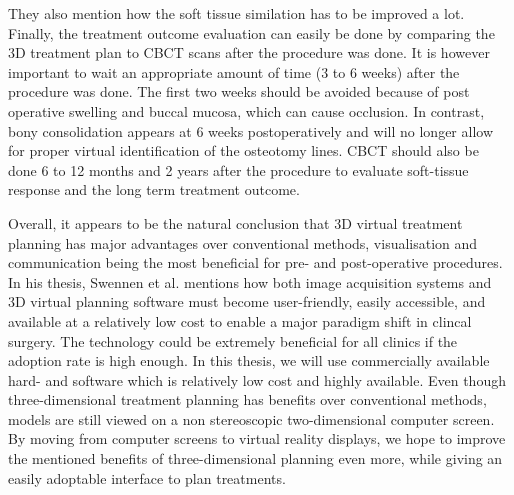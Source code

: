 They also mention how the soft tissue similation has to be improved a lot.
Finally, the treatment outcome evaluation can easily be done by comparing the 3D treatment plan to CBCT scans after the procedure was done.
It is however important to wait an appropriate amount of time (3 to 6 weeks) after the procedure was done.
The first two weeks should be avoided because of post operative swelling and buccal mucosa, which can cause occlusion.
In contrast, bony consolidation appears at 6 weeks postoperatively and will no longer allow for proper virtual identification of the osteotomy lines.
CBCT should also be done 6 to 12 months and 2 years after the procedure to evaluate soft-tissue response and the long term treatment outcome.

Overall, it appears to be the natural conclusion that 3D virtual treatment planning has major advantages over conventional methods, visualisation and communication being the most beneficial for pre- and post-operative procedures.
In his thesis, Swennen et al. mentions how both image acquisition systems and 3D virtual planning software must become user-friendly, easily accessible, and available at a relatively low cost \cite{swennen2009three} to enable a major paradigm shift in clincal surgery.
The technology could be extremely beneficial for all clinics if the adoption rate is high enough.
In this thesis, we will use commercially available hard- and software which is relatively low cost and highly available.
Even though three-dimensional treatment planning has benefits over conventional methods, models are still viewed on a non stereoscopic two-dimensional computer screen.
By moving from computer screens to virtual reality displays, we hope to improve the mentioned benefits of three-dimensional planning even more, while giving an easily adoptable interface to plan treatments.
